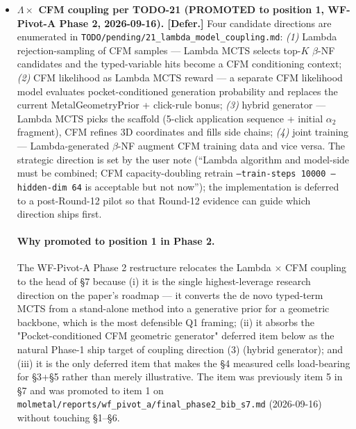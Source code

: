 \begin{itemize}

  \item \textbf{$\Lambda \times$ CFM coupling per TODO-21 (PROMOTED to
    position 1, WF-Pivot-A Phase 2, 2026-09-16).  [Defer.]}\label{sec:future:lambda-cfm-coupling}
    Four candidate directions are enumerated in
    \texttt{TODO/pending/21\_lambda\_model\_coupling.md}:
    \emph{(1)} Lambda rejection-sampling of CFM samples --- Lambda
    MCTS selects top-$K$ $\beta$-NF candidates and the typed-variable
    hits become a CFM conditioning context;
    \emph{(2)} CFM likelihood as Lambda MCTS reward --- a separate
    CFM likelihood model evaluates pocket-conditioned generation
    probability and replaces the current MetalGeometryPrior +
    click-rule bonus;
    \emph{(3)} hybrid generator --- Lambda MCTS picks the
    scaffold (5-click application sequence + initial $\alpha_2$
    fragment), CFM refines 3D coordinates and fills side chains;
    \emph{(4)} joint training --- Lambda-generated $\beta$-NF
    augment CFM training data and vice versa.  The strategic
    direction is set by the user note (``Lambda algorithm and
    model-side must be combined; CFM capacity-doubling retrain
    \texttt{--train-steps 10000 --hidden-dim 64} is acceptable but
    not now''); the implementation is deferred to a post-Round-12
    pilot so that Round-12 evidence can guide which direction
    ships first.

    \paragraph{Why promoted to position 1 in Phase 2.}
    The WF-Pivot-A Phase 2 restructure relocates the Lambda $\times$
    CFM coupling to the head of \S7 because (i) it is the single
    highest-leverage research direction on the paper's roadmap ---
    it converts the de novo typed-term MCTS from a stand-alone
    method into a generative prior for a geometric backbone, which
    is the most defensible Q1 framing; (ii) it absorbs the
    "Pocket-conditioned CFM geometric generator" deferred item
    below as the natural Phase-1 ship target of coupling direction
    (3) (hybrid generator); and (iii) it is the only deferred
    item that makes the §4 measured cells load-bearing for §3+§5
    rather than merely illustrative.  The item was previously
    item 5 in \S7 and was promoted to item 1 on
    \texttt{molmetal/reports/wf\_pivot\_a/final\_phase2\_bib\_s7.md}
    (2026-09-16) without touching \S1--\S6.


\end{itemize}
